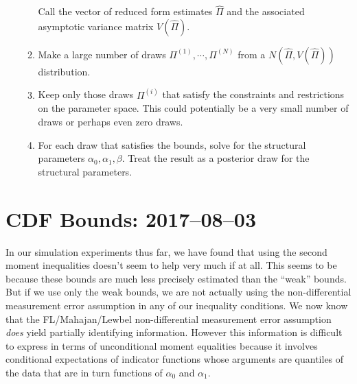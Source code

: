 \documentclass[12pt]{article}
\begin{document}
\begin{enumerate}
\begin{enumerate}
        Call the vector of reduced form estimates $\widehat{\Pi}$ and the associated asymptotic variance matrix $V(\widehat{\Pi})$.
      \item  Make a large number of draws $\Pi^{(1)}, \cdots, \Pi^{(N)}$ from a $N\left(\widehat{\Pi}, V(\widehat{\Pi})\right)$ distribution.
      \item Keep only those draws $\Pi^{(i)}$ that satisfy the constraints and restrictions on the parameter space.
        This could potentially be a very small number of draws or perhaps even zero draws.
      \item For each draw that satisfies the bounds, solve for the structural parameters $\alpha_0, \alpha_1, \beta$.
        Treat the result as a posterior draw for the structural parameters.
    \end{enumerate}
\end{enumerate}


\section{CDF Bounds: 2017--08--03}
In our simulation experiments thus far, we have found that using the second moment inequalities doesn't seem to help very much if at all.
This seems to be because these bounds are much less precisely estimated than the ``weak'' bounds.
But if we use only the weak bounds, we are not actually using the non-differential measurement error assumption in any of our inequality conditions.
We now know that the FL/Mahajan/Lewbel non-differential measurement error assumption \emph{does} yield partially identifying information.
However this information is difficult to express in terms of unconditional moment equalities because it involves conditional expectations of indicator functions whose arguments are quantiles of the data that are in turn functions of $\alpha_0$ and $\alpha_1$.
\end{document}
